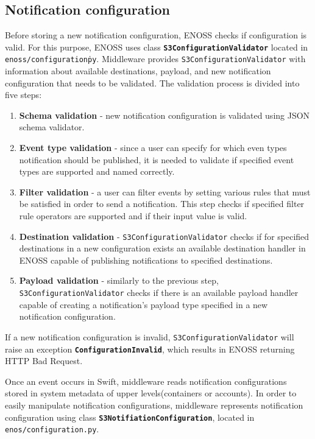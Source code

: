     \subsection{Notification configuration}
    Before storing a new notification configuration, ENOSS checks if configuration is valid. For this purpose, ENOSS uses class \textbf{\texttt{S3ConfigurationValidator}} located in \texttt{enoss/configuration\.py}. Middleware provides \texttt{S3ConfigurationValidator} with information about available destinations, payload, and new notification configuration that needs to be validated. The validation process is divided into five steps:
    \begin{enumerate}
        \item \textbf{Schema validation} - new notification configuration is validated using JSON schema validator.
        \item \textbf{Event type validation} - since a user can specify for which even types notification should be published, it is needed to validate if specified event types are supported and named correctly.
        \item \textbf{Filter validation} - a user can filter events by setting various rules that must be satisfied in order to send a notification. This step checks if specified filter rule operators are supported and if their input value is valid.
        \item \textbf{Destination validation} - \texttt{S3ConfigurationValidator} checks if for specified destinations in a new configuration exists an available destination handler in ENOSS capable of publishing notifications to specified destinations.
        \item \textbf{Payload validation} - similarly to the previous step, \texttt{S3ConfigurationValidator} checks if there is an available payload handler capable of creating a notification's payload type specified in a new notification configuration.
    \end{enumerate}

    If a new notification configuration is invalid, \texttt{S3ConfigurationValidator} will raise an  exception \textbf{\texttt{ConfigurationInvalid}}, which results in ENOSS returning HTTP Bad Request.

    Once an event occurs in Swift, middleware reads notification configurations stored in system metadata of upper levels(containers or accounts). In order to easily manipulate notification configurations, middleware represents notification configuration using class  \textbf{\texttt{S3NotifiationConfiguration}}, located in \texttt{enos/configuration.py}.

